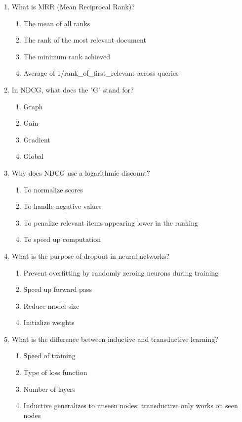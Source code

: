 \documentclass[12pt,a4paper]{article}
\begin{document}
\begin{enumerate}
\item What is MRR (Mean Reciprocal Rank)?
\begin{enumerate}[label=\Alph*)]
    \item The mean of all ranks
    \item The rank of the most relevant document
    \item The minimum rank achieved
    \item Average of 1/rank\_of\_first\_relevant across queries
\end{enumerate}

\item In NDCG, what does the "G" stand for?
\begin{enumerate}[label=\Alph*)]
    \item Graph
    \item Gain
    \item Gradient
    \item Global
\end{enumerate}

\item Why does NDCG use a logarithmic discount?
\begin{enumerate}[label=\Alph*)]
    \item To normalize scores
    \item To handle negative values
    \item To penalize relevant items appearing lower in the ranking
    \item To speed up computation
\end{enumerate}

\item What is the purpose of dropout in neural networks?
\begin{enumerate}[label=\Alph*)]
    \item Prevent overfitting by randomly zeroing neurons during training
    \item Speed up forward pass
    \item Reduce model size
    \item Initialize weights
\end{enumerate}

\item What is the difference between inductive and transductive learning?
\begin{enumerate}[label=\Alph*)]
    \item Speed of training
    \item Type of loss function
    \item Number of layers
    \item Inductive generalizes to unseen nodes; transductive only works on seen nodes
\end{enumerate}


\end{enumerate}
\end{document}

